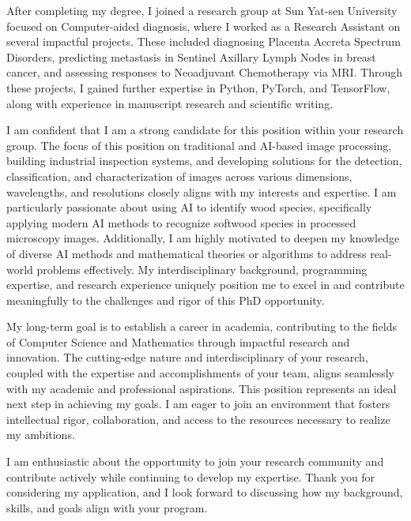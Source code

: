 \documentclass[11pt,a4paper, final]{moderncv}
\newcommand{\spacesubsection}{\vspace{0.2cm}}
\begin{document}
After completing my degree, 
I joined a research group at Sun Yat-sen University focused on Computer-aided diagnosis, 
where I worked as a Research Assistant on several impactful projects. 
These included diagnosing Placenta Accreta Spectrum Disorders, 
predicting metastasis in Sentinel Axillary Lymph Nodes in breast cancer, 
and assessing responses to Neoadjuvant Chemotherapy via MRI. 
Through these projects, I gained further expertise in Python, PyTorch, and TensorFlow, 
along with experience in manuscript research and scientific writing.

I am confident that I am a strong candidate for this position within your research group. 
The focus of this position on traditional and AI-based image processing, 
building industrial inspection systems, and developing solutions for the detection, 
classification, and characterization of images across various dimensions, wavelengths, 
and resolutions closely aligns with my interests and expertise. 
I am particularly passionate about using AI to identify wood species, 
specifically applying modern AI methods to recognize softwood species in processed microscopy images. 
Additionally, I am highly motivated to deepen my knowledge of diverse AI methods and mathematical theories 
or algorithms to address real-world problems effectively. 
My interdisciplinary background, programming expertise, and research experience uniquely position me 
to excel in and contribute meaningfully to the challenges and rigor of this PhD opportunity.

My long-term goal is to establish a career in academia, 
contributing to the fields of Computer Science and Mathematics through impactful research and innovation. 
The cutting-edge nature and interdisciplinary of your research, 
coupled with the expertise and accomplishments of your team, 
aligns seamlessly with my academic and professional aspirations. 
This position represents an ideal next step in achieving my goals. 
I am eager to join an environment that fosters intellectual rigor, collaboration, 
and access to the resources necessary to realize my ambitions.

I am enthusiastic about the opportunity to join your research community 
and contribute actively while continuing to develop my expertise. 
Thank you for considering my application, 
and I look forward to discussing how my background, skills, and goals align with your program.

\end{document}
